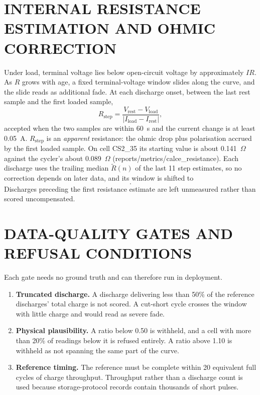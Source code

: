 \section{INTERNAL RESISTANCE ESTIMATION AND OHMIC CORRECTION}
\label{sec:rstep}

Under load, terminal voltage lies below open-circuit voltage by approximately $IR$. As $R$ grows with age, a fixed terminal-voltage window slides along the curve, and the slide reads as additional fade. At each discharge onset, between the last rest sample and the first loaded sample,
\begin{equation}
R_\mathrm{step} = \frac{V_\mathrm{rest} - V_\mathrm{load}}{|I_\mathrm{load} - I_\mathrm{rest}|},
\label{eq:rstep}
\end{equation}
accepted when the two samples are within 60~s and the current change is at least 0.05~A. $R_\mathrm{step}$ is an \emph{apparent} resistance: the ohmic drop plus polarisation accrued by the first loaded sample. On cell CS2\_35 its starting value is about 0.141~$\Omega$ against the cycler's about 0.089~$\Omega$ (reports/metrics/calce\_resistance). Each discharge uses the trailing median $\tilde R(n)$ of the last 11 step estimates, so no correction depends on later data, and its window is shifted to
\begin{equation}
[V_\mathrm{low} - |I_n|\tilde R(n),\; V_\mathrm{high} - |I_n|\tilde R(n)] .
\label{eq:shift}
\end{equation}
Discharges preceding the first resistance estimate are left unmeasured rather than scored uncompensated.

\section{DATA-QUALITY GATES AND REFUSAL CONDITIONS}
\label{sec:gates}

Each gate needs no ground truth and can therefore run in deployment.

\begin{enumerate}
    \item \textbf{Truncated discharge.} A discharge delivering less than 50\% of the reference discharges' total charge is not scored. A cut-short cycle crosses the window with little charge and would read as severe fade.
    \item \textbf{Physical plausibility.} A ratio below 0.50 is withheld, and a cell with more than 20\% of readings below it is refused entirely. A ratio above 1.10 is withheld as not spanning the same part of the curve.
    \item \textbf{Reference timing.} The reference must be complete within 20 equivalent full cycles of charge throughput. Throughput rather than a discharge count is used because storage-protocol records contain thousands of short pulses.
\end{enumerate}

